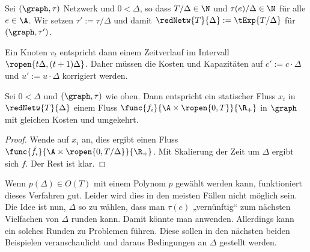 \begin{definition}\label{def:red_network}
    Sei $(\graph, \tau)$ Netzwerk und $0 < \Delta$, so dass $T/\Delta \in \N$
    und $\tau(e)/\Delta \in \N$ für alle $e \in \A$. Wir setzen
    $\tau' := \tau/\Delta$ und damit
    $\redNetw{T}{\Delta} := \tExp{T/\Delta}$ für $(\graph, \tau')$.
    
    Ein Knoten $v_t$ entspricht dann einem Zeitverlauf im Intervall
    $\ropen{t \Delta, (t+1) \Delta}$. Daher müssen die Kosten und Kapazitäten
    auf $c' := c \cdot \Delta$ und $u' := u \cdot \Delta$ korrigiert werden.
\end{definition}

\begin{lemma}\label{lem:reduced_static_dyn_conv}
    Sei $0 < \Delta$ und $(\graph, \tau)$ wie oben. Dann entspricht ein statischer
    Fluss $x_i$ in $\redNetw{T}{\Delta}$ einem Fluss
    $\func{f_i}{\A \times \ropen{0, T}}{\R_+}$ in $\graph$ mit gleichen Kosten
    und umgekehrt.
    
    \begin{proof}
        Wende  auf $x_i$ an, dies ergibt einen Fluss
        $\func{\hat{f}_i}{\A \times \ropen{0, T/\Delta}}{\R_+}$. Mit Skalierung der
        Zeit um $\Delta$ ergibt sich $f$. Der Rest ist klar.
    \end{proof}
\end{lemma}

Wenn $p(\Delta) \in O(T)$ mit einem Polynom $p$ gewählt werden kann, funktioniert
dieses Verfahren gut. Leider wird dies in den meisten Fällen nicht möglich sein.
Die Idee ist nun, $\Delta$ so zu wählen, dass man $\tau(e)$ „vernünftig“ zum
nächsten Vielfachen von $\Delta$ runden kann. Damit könnte man
 anwenden. Allerdings kann ein solches
Runden zu Problemen führen. Diese sollen in den nächsten beiden Beispielen
veranschaulicht und daraus Bedingungen an $\Delta$ gestellt werden.

